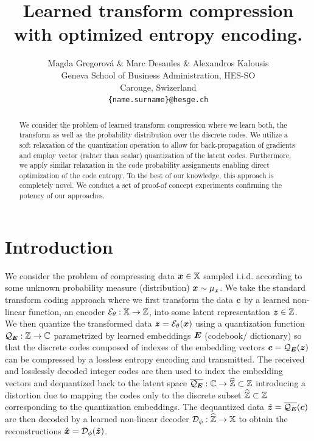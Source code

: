 \documentclass{article} %
\title{Learned transform compression with optimized entropy encoding.}
\author{Magda Gregorová \& Marc Desaules \& Alexandros Kalousis \\
Geneva School of Business Administration, HES-SO \\
Carouge, Swizerland \\
\texttt{\{name.surname\}@hesge.ch} \\
}
\newcommand{\mux}{\mu_x}
\newcommand{\gEt}{\gE_\theta}
\newcommand{\gQE}{\gQ_\mE}
\newcommand{\gDp}{\gD_\phi}
\newcommand{\vzh}{\hat{\vz}}
\newcommand{\vxh}{\hat{\vx}}
\begin{document}
\maketitle

\begin{abstract}
We consider the problem of learned transform compression where we learn both, the transform as well as the probability distribution over the discrete codes.
We utilize a soft relaxation of the quantization operation to allow for back-propagation of gradients and employ vector (rahter than scalar) quantization of the latent codes.
Furthermore, we apply similar relaxation in the code probability assignments enabling direct optimization of the code entropy.
To the best of our knowledge, this approach is completely novel.
We conduct a set of proof-of concept experiments confirming the potency of our approaches.
\end{abstract}

\section{Introduction}\label{sec:Intro}

We consider the problem of compressing data ${\bm{x}} \in {\mathbb{X}}$ sampled i.i.d. according to some unknown probability measure (distribution) $\vx \sim \mux$.
We take the standard transform coding \citep{sayoodIntroductionDataCompression2012} approach where we first transform the data ${\bm{c}}$ by a learned non-linear function, an encoder $\gEt : \sX \to \sZ$, into some latent representation ${\bm{z}} \in {\mathbb{Z}}$.
We then quantize the transformed data $\vz = \gEt(\vx)$ using a quantization function $\gQE : \sZ \to \sC$ parametrized by learned embeddings ${\bm{E}}$ (codebook/ dictionary) so that the discrete codes composed of indexes of the embedding vectors $\vc = \gQE(\vz)$ can be compressed by a lossless entropy encoding and transmitted.
The received and losslessly decoded integer codes are then used to index the embedding vectors and dequantized back to the latent space $\overline{\gQE} : \sC \to \widehat{\sZ} \subset \sZ$ introducing a distortion due to mapping the codes only to the discrete subset $\widehat{{\mathbb{Z}}} \subset {\mathbb{Z}}$ corresponding to the quantization embeddings.
The dequantized data $\vzh = \overline{\gQE}(\vc)$ are then decoded by a learned non-linear decoder $\gDp : \widehat{\sZ} \to \sX$ to obtain the reconstructions $\vxh = \gDp(\vzh)$.
\end{document}
